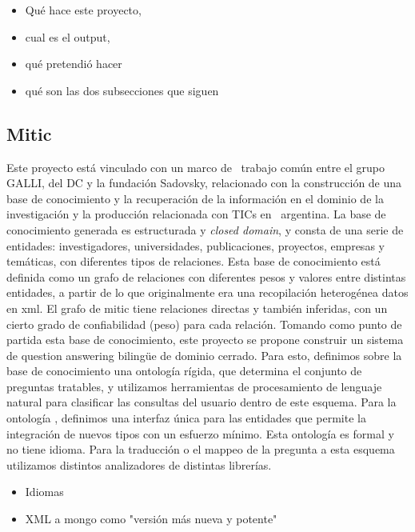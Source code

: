 \begin{itemize}
\item Qué hace este proyecto, 
\item cual es el output, 
\item qué pretendió hacer
\item qué son las dos subsecciones que siguen
\end{itemize}



\subsection{Mitic}

Este proyecto está vinculado con un marco de \ trabajo com\'un entre el
grupo GALLI, del DC y la fundaci\'on Sadovsky, relacionado con la construcción de una base de conocimiento
 y la recuperaci\'on de la informaci\'on en el dominio de la investigaci\'on y la
producci\'on relacionada con TICs en \ argentina. La base de
conocimiento generada es estructurada y \textit{closed domain}, y consta de
una serie de entidades: investigadores, universidades, publicaciones,
proyectos, empresas y tem\'aticas, con diferentes tipos de relaciones.
Esta base de conocimiento está definida como un grafo de relaciones con diferentes pesos y valores entre
distintas entidades, a partir de lo que originalmente era una
recopilaci\'on heterog\'enea datos en xml. El grafo de mitic
tiene relaciones directas y también inferidas, con un cierto grado
de confiabilidad (peso) para cada relación. Tomando como punto de
partida esta base de conocimiento, este proyecto se propone construir
un sistema de question answering biling\"ue de dominio cerrado.
Para esto, definimos sobre la base de conocimiento una ontolog\'ia
r\'igida, que determina el conjunto de preguntas tratables, y
utilizamos herramientas de procesamiento de lenguaje natural para
clasificar las consultas del usuario dentro de este esquema. Para la
ontolog\'ia , definimos una interfaz \'unica para las entidades que
permite la integraci\'on de nuevos tipos con un esfuerzo m\'inimo. 
Esta ontolog\'ia es formal y no tiene idioma. Para la
traducci\'on o el mappeo de la pregunta a esta esquema utilizamos distintos
analizadores de distintas librer\'ias.

\begin{itemize}
\item Idiomas
\item XML a mongo como "versión más nueva y potente"
\end{itemize}

